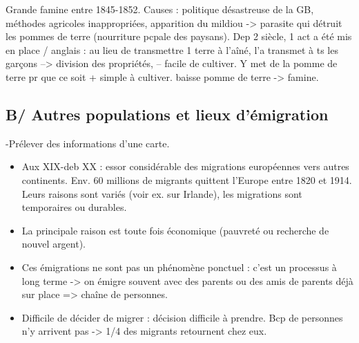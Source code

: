 \documentclass{beamer}
\begin{document}
\begin{frame}
Grande famine entre 1845-1852.
Causes : politique désastreuse de la GB, méthodes agricoles inappropriées, apparition du mildiou -> parasite qui détruit les pommes de terre (nourriture pcpale des paysans).
Dep 2 siècle, 1 act a été mis en place / anglais : au lieu de transmettre 1 terre à l'aîné, l'a transmet à ts les garçons --> division des propriétés, -- facile de cultiver. Y met de la pomme de terre pr que ce soit + simple à cultiver.
baisse pomme de terre -> famine.
\end{frame}

\subsection{B/ Autres populations et lieux d'émigration}

\begin{frame}{-}{Prélever des informations d'une carte.}



\end{frame}

\begin{frame}
\begin{itemize}
\item Aux XIX-deb XX : essor considérable des migrations européennes vers autres continents. Env. 60 millions de migrants quittent l'Europe entre 1820 et 1914. Leurs raisons sont variés (voir ex. sur Irlande), les migrations sont temporaires ou durables. \\
\item La principale raison est toute fois économique (pauvreté ou recherche de nouvel argent). 
\item Ces émigrations ne sont pas un phénomène ponctuel : c'est un processus à long terme -> on émigre souvent avec des parents ou des amis de parents déjà sur place => chaîne de personnes.
\item Difficile de décider de migrer : décision difficile à prendre. Bcp de personnes n'y arrivent pas -> 1/4 des migrants retournent chez eux.
\end{itemize}
\end{frame}
\end{document}
